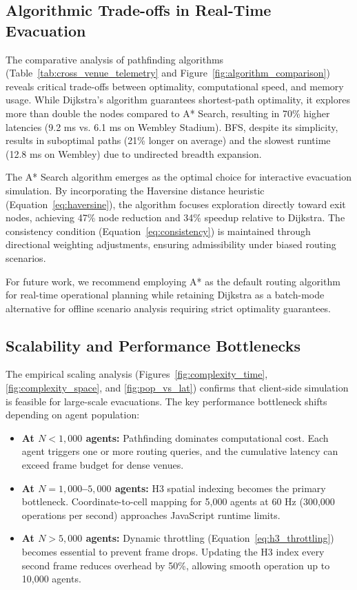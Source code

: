 \documentclass[12pt,a4paper,oneside]{report}
\begin{document}
\subsection{Algorithmic Trade-offs in Real-Time Evacuation}
The comparative analysis of pathfinding algorithms (Table~\ref{tab:cross_venue_telemetry} and Figure~\ref{fig:algorithm_comparison}) reveals critical trade-offs between optimality, computational speed, and memory usage. While Dijkstra's algorithm guarantees shortest-path optimality, it explores more than double the nodes compared to A* Search, resulting in 70\% higher latencies (9.2 ms vs. 6.1 ms on Wembley Stadium). BFS, despite its simplicity, results in suboptimal paths (21\% longer on average) and the slowest runtime (12.8 ms on Wembley) due to undirected breadth expansion.

The A* Search algorithm emerges as the optimal choice for interactive evacuation simulation. By incorporating the Haversine distance heuristic (Equation~\ref{eq:haversine}), the algorithm focuses exploration directly toward exit nodes, achieving 47\% node reduction and 34\% speedup relative to Dijkstra. The consistency condition (Equation~\ref{eq:consistency}) is maintained through directional weighting adjustments, ensuring admissibility under biased routing scenarios.

For future work, we recommend employing A* as the default routing algorithm for real-time operational planning while retaining Dijkstra as a batch-mode alternative for offline scenario analysis requiring strict optimality guarantees.

\subsection{Scalability and Performance Bottlenecks}
The empirical scaling analysis (Figures~\ref{fig:complexity_time}, \ref{fig:complexity_space}, and \ref{fig:pop_vs_lat}) confirms that client-side simulation is feasible for large-scale evacuations. The key performance bottleneck shifts depending on agent population:

\begin{itemize}
    \item \textbf{At $N < 1,000$ agents:} Pathfinding dominates computational cost. Each agent triggers one or more routing queries, and the cumulative latency can exceed frame budget for dense venues.
    \item \textbf{At $N = 1,000$--$5,000$ agents:} H3 spatial indexing becomes the primary bottleneck. Coordinate-to-cell mapping for 5,000 agents at 60 Hz (300,000 operations per second) approaches JavaScript runtime limits.
    \item \textbf{At $N > 5,000$ agents:} Dynamic throttling (Equation~\ref{eq:h3_throttling}) becomes essential to prevent frame drops. Updating the H3 index every second frame reduces overhead by 50\%, allowing smooth operation up to 10,000 agents.
\end{itemize}
\end{document}
